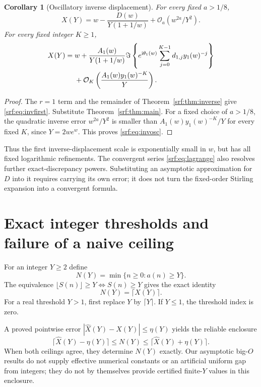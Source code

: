 \documentclass[11pt]{article}
\newtheorem{corollary}[theorem]{Corollary}
\theoremstyle{remark}\newtheorem{remark}[theorem]{Remark}
\newcommand{\OO}{\mathcal O}
\newcommand{\ii}{\mathrm i}
\begin{document}
\begin{corollary}[Oscillatory inverse displacement]\label{srf:cor:invosc}
For every fixed $a>1/8$,
\begin{equation}\label{srf:eq:invfirst}
 X(Y)=w-\frac{D(w)}{Y(1+1/w)}
                  +\OO_a(w^{2a}/Y^2).
\end{equation}
For every fixed integer $K\ge1$,
\begin{align}
 X(Y)={}&w+\frac{A_1(w)}{Y(1+1/w)}
       \Im\left\{e^{\ii\theta_1(w)}
                   \sum_{j=0}^{K-1}d_{1,j}y_1(w)^{-j}\right\}\notag\\
 &+\OO_K\left(\frac{A_1(w)y_1(w)^{-K}}Y\right).\label{srf:eq:invosc}
\end{align}
\end{corollary}
\begin{proof}
The $r=1$ term and the remainder of Theorem~\ref{srf:thm:inverse} give \eqref{srf:eq:invfirst}. Substitute Theorem~\ref{srf:thm:main}. For a fixed choice of $a>1/8$, the quadratic inverse error $w^{2a}/Y^2$ is smaller than $A_1(w)y_1(w)^{-K}/Y$ for every fixed $K$, since $Y=2we^w$. This proves \eqref{srf:eq:invosc}.
\end{proof}

Thus the first inverse-displacement scale is exponentially small in $w$, but has all fixed logarithmic refinements. The convergent series \eqref{srf:eq:lagrange} also resolves further exact-discrepancy powers. Substituting an asymptotic approximation for $D$ into it requires carrying its own error; it does not turn the fixed-order Stirling expansion into a convergent formula.

\section{Exact integer thresholds and failure of a naive ceiling}\label{srf:sec:thresholds}
For an integer $Y\ge2$ define
\begin{equation}\label{srf:eq:N}
 N(Y)=\min\{n\ge0:a(n)\ge Y\}.
\end{equation}
The equivalence $\lfloor S(n)\rfloor\ge Y\iff S(n)\ge Y$ gives the exact identity
\begin{equation}\label{srf:eq:ceilexact}
 N(Y)=\lceil X(Y)\rceil.
\end{equation}
For a real threshold $Y>1$, first replace $Y$ by $\lceil Y\rceil$. If $Y\le1$, the threshold index is zero.

A proved pointwise error $|\widehat X(Y)-X(Y)|\le\eta(Y)$ yields the reliable enclosure
\begin{equation}\label{srf:eq:ceilenclosure}
 \lceil\widehat X(Y)-\eta(Y)\rceil
       \le N(Y)\le
 \lceil\widehat X(Y)+\eta(Y)\rceil.
\end{equation}
When both ceilings agree, they determine $N(Y)$ exactly. Our asymptotic big-$O$ results do not supply effective numerical constants or an artificial uniform gap from integers; they do not by themselves provide certified finite-$Y$ values in this enclosure.
\end{document}
